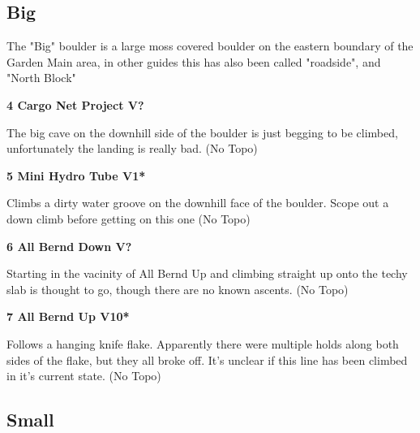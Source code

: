 \begin{multicols}{2}
			\subsection*{Big}\label{bf:Big}
			The "Big" boulder is a large moss covered boulder on the eastern boundary of the Garden Main area, in other guides this has also been called "roadside", and "North Block"\\
			
					\label{rt:Cargo Net Project}
\colorbox{black!20}{
\parbox{0.95\linewidth}{
\textbf{
4 Cargo Net Project V?  
}
}
}

					\begin{adjustwidth}{0.5cm}{}				
					The big cave on the downhill side of the boulder is just begging to be climbed, unfortunately the landing is really bad.
						\newline (No Topo) 
					\end{adjustwidth}
					\label{rt:Mini Hydro Tube}
\colorbox{green!20}{
\parbox{0.95\linewidth}{
\textbf{
5 Mini Hydro Tube V1*  \warn
}
}
}

					\begin{adjustwidth}{0.5cm}{}				
					Climbs a dirty water groove on the downhill face of the boulder. Scope out a down climb before getting on this one
						\newline (No Topo) 
					\end{adjustwidth}
					\label{rt:All Bernd Down}
\colorbox{black!20}{
\parbox{0.95\linewidth}{
\textbf{
6 All Bernd Down V?  
}
}
}

					\begin{adjustwidth}{0.5cm}{}				
					Starting in the vacinity of All Bernd Up and climbing straight up onto the techy slab is thought to go, though there are no known ascents.
						\newline (No Topo) 
					\end{adjustwidth}
					\label{rt:All Bernd Up}
\colorbox{red!20}{
\parbox{0.95\linewidth}{
\textbf{
7 All Bernd Up V10*  
}
}
}

					\begin{adjustwidth}{0.5cm}{}				
					Follows a hanging knife flake. Apparently there were multiple holds along both sides of the flake, but they all broke off. It's unclear if this line has been climbed in it's current state.
						\newline (No Topo) 
					\end{adjustwidth}
			\subsection*{Small}\label{bf:Small}
						

\end{multicols}
